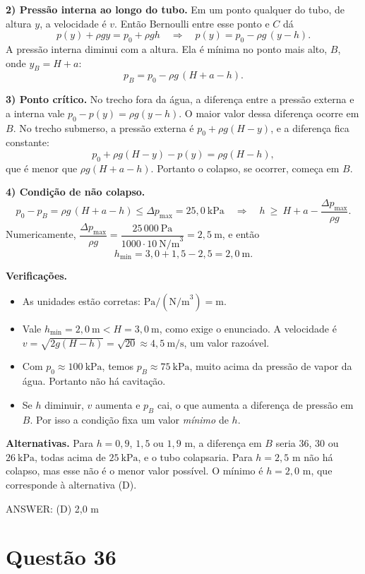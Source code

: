 \documentclass{article}%
\begin{document}
\textbf{2) Pressão interna ao longo do tubo.} Em um ponto qualquer do tubo, de altura $y$, a velocidade é $v$. Então Bernoulli entre esse ponto e $C$ dá
\[
p(y)+\rho g y=p_0+\rho g h \quad\Longrightarrow\quad p(y)=p_0-\rho g\,(y-h).
\]
A pressão interna diminui com a altura. Ela é mínima no ponto mais alto, $B$, onde $y_B=H+a$:
\[
p_B=p_0-\rho g\,(H+a-h).
\]

\textbf{3) Ponto crítico.} No trecho fora da água, a diferença entre a pressão externa e a interna vale $p_0-p(y)=\rho g(y-h)$. O maior valor dessa diferença ocorre em $B$. No trecho submerso, a pressão externa é $p_0+\rho g(H-y)$, e a diferença fica constante:
\[
p_0+\rho g(H-y)-p(y)=\rho g(H-h),
\]
que é menor que $\rho g(H+a-h)$. Portanto o colapso, se ocorrer, começa em $B$.

\textbf{4) Condição de não colapso.}
\[
p_0-p_B=\rho g\,(H+a-h)\le \Delta p_{\max}=25{,}0\ \text{kPa}
\quad\Longrightarrow\quad
h\ \ge\ H+a-\frac{\Delta p_{\max}}{\rho g}.
\]
Numericamente, $\dfrac{\Delta p_{\max}}{\rho g}=\dfrac{25\,000\ \text{Pa}}{1000\cdot 10\ \text{N/m}^3}=2{,}5\ \text{m}$, e então
\[
h_{\min}=3{,}0+1{,}5-2{,}5=2{,}0\ \text{m}.
\]

\textbf{Verificações.}
\begin{itemize}
\item As unidades estão corretas: $\text{Pa}/(\text{N/m}^3)=\text{m}$.
\item Vale $h_{\min}=2{,}0\ \text{m}<H=3{,}0\ \text{m}$, como exige o enunciado. A velocidade é $v=\sqrt{2g(H-h)}=\sqrt{20}\approx 4{,}5\ \text{m/s}$, um valor razoável.
\item Com $p_0\approx 100\ \text{kPa}$, temos $p_B\approx 75\ \text{kPa}$, muito acima da pressão de vapor da água. Portanto não há cavitação.
\item Se $h$ diminuir, $v$ aumenta e $p_B$ cai, o que aumenta a diferença de pressão em $B$. Por isso a condição fixa um valor \emph{mínimo} de $h$.
\end{itemize}

\textbf{Alternativas.} Para $h=0{,}9$, $1{,}5$ ou $1{,}9$ m, a diferença em $B$ seria $36$, $30$ ou $26\ \text{kPa}$, todas acima de $25\ \text{kPa}$, e o tubo colapsaria. Para $h=2{,}5$ m não há colapso, mas esse não é o menor valor possível. O mínimo é $h=2{,}0$ m, que corresponde à alternativa (D).

ANSWER: (D) 2,0 m%
\newpage%
\section*{Questão 36}
\end{document}
